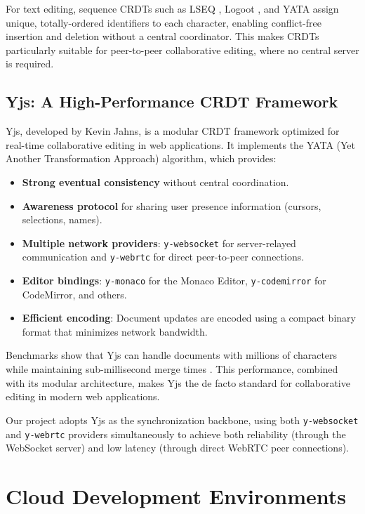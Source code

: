 \documentclass[12pt,a4paper,oneside]{report}
\begin{document}
For text editing, sequence CRDTs such as LSEQ \cite{nedelec2013}, Logoot \cite{weiss2010}, and YATA \cite{nicolaescu2020} assign unique, totally-ordered identifiers to each character, enabling conflict-free insertion and deletion without a central coordinator. This makes CRDTs particularly suitable for peer-to-peer collaborative editing, where no central server is required.

\subsection{Yjs: A High-Performance CRDT Framework}

Yjs, developed by Kevin Jahns, is a modular CRDT framework optimized for real-time collaborative editing in web applications. It implements the YATA (Yet Another Transformation Approach) algorithm, which provides:

\begin{itemize}
    \item \textbf{Strong eventual consistency} without central coordination.
    \item \textbf{Awareness protocol} for sharing user presence information (cursors, selections, names).
    \item \textbf{Multiple network providers}: \texttt{y-websocket} for server-relayed communication and \texttt{y-webrtc} for direct peer-to-peer connections.
    \item \textbf{Editor bindings}: \texttt{y-monaco} for the Monaco Editor, \texttt{y-codemirror} for CodeMirror, and others.
    \item \textbf{Efficient encoding}: Document updates are encoded using a compact binary format that minimizes network bandwidth.
\end{itemize}

Benchmarks show that Yjs can handle documents with millions of characters while maintaining sub-millisecond merge times \cite{nicolaescu2020}. This performance, combined with its modular architecture, makes Yjs the de facto standard for collaborative editing in modern web applications.

Our project adopts Yjs as the synchronization backbone, using both \texttt{y-websocket} and \texttt{y-webrtc} providers simultaneously to achieve both reliability (through the WebSocket server) and low latency (through direct WebRTC peer connections).

\section{Cloud Development Environments}
\end{document}
